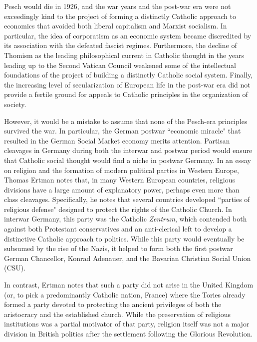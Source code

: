 \documentclass{article}
\begin{document}
Pesch would die in 1926, and the war years and the post-war era were not exceedingly kind to the project of forming a distinctly Catholic approach to economics that avoided both liberal capitalism and Marxist socialism.  In particular, the idea of corporatism as an economic system became discredited by its association with the defeated fascist regimes.  Furthermore, the decline of Thomism as the leading philosophical current in Catholic thought in the years leading up to the Second Vatican Council weakened some of the intellectual foundations of the project of building a distinctly Catholic social system.  Finally, the increasing level of secularization of European life in the post-war era did not provide a fertile ground for appeals to Catholic principles in the organization of society.\citep{almodovarteixeira2008}\medskip

However, it would be a mistake to assume that none of the Pesch-era principles survived the war.  In particular, the German postwar ``economic miracle" that resulted in the German Social Market economy merits attention.  Partisan cleavages in Germany during both the interwar and postwar period would ensure that Catholic social thought would find a niche in postwar Germany.  In an essay on religion and the formation of modern political parties in Western Europe, Thomas Ertman notes that, in many Western European countries, religious divisions have a large amount of explanatory power, perhaps even more than class cleavages.\citep{ertman2009western}  Specifically, he notes that several countries developed ``parties of religious defense" designed to protect the rights of the Catholic Church.  In interwar Germany, this party was the Catholic \emph{Zentrum}, which contended both against both Protestant conservatives and an anti-clerical left to develop a distinctive Catholic approach to politics.  While this party would eventually be subsumed by the rise of the Nazis, it helped to form both the first postwar German Chancellor, Konrad Adenauer, and the Bavarian Christian Social Union (CSU).\medskip

In contrast, Ertman notes that such a party did not arise in the United Kingdom (or, to pick a predominantly Catholic nation, France) where the Tories already formed a party devoted to protecting the ancient privileges of both the aristocracy and the established church.  While the preservation of religious institutions was a partial motivator of that party, religion itself was not a major division in British politics after the settlement following the Glorious Revolution.\medskip
\end{document}
